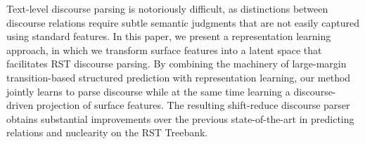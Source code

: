 Text-level discourse parsing is notoriously difficult, as distinctions between discourse relations require subtle semantic judgments that are not easily captured using standard features. In this paper, we present a representation learning approach, in which we transform surface features into a latent space that facilitates RST discourse parsing. By combining the machinery of large-margin transition-based structured prediction with representation learning, our method jointly learns to parse discourse while at the same time learning a discourse-driven projection of surface features. The resulting shift-reduce discourse parser obtains substantial improvements over the previous state-of-the-art in predicting relations and nuclearity on the RST Treebank.
